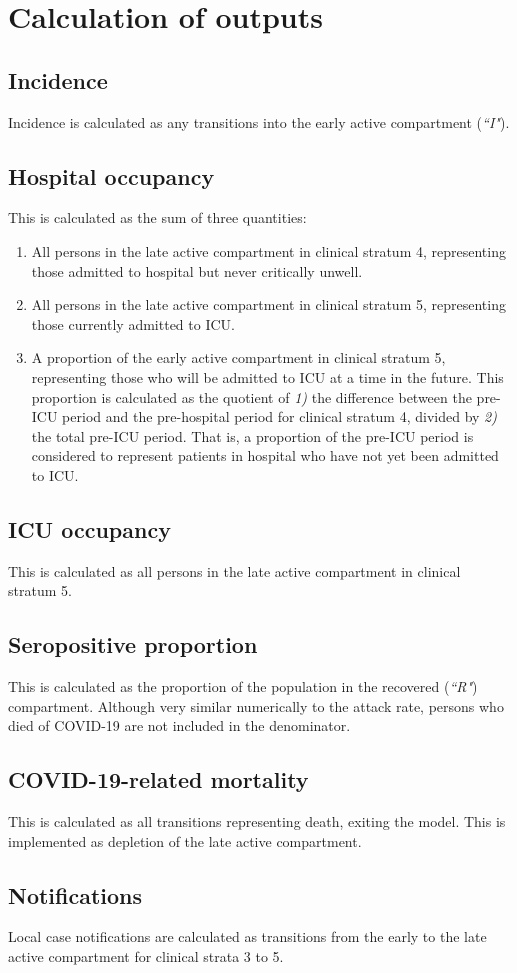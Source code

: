 \section{Calculation of outputs}

\subsection{Incidence}
Incidence is calculated as any transitions into the early active compartment (\textit{``I"}).

\subsection{Hospital occupancy}
This is calculated as the sum of three quantities:
\begin{enumerate}
    \item All persons in the late active compartment in clinical stratum 4, representing those admitted to hospital but never critically unwell.
    \item All persons in the late active compartment in clinical stratum 5, representing those currently admitted to ICU.
    \item A proportion of the early active compartment in clinical stratum 5, representing those who will be admitted to ICU at a time in the future. This proportion is calculated as the quotient of \textit{1)} the difference between the pre-ICU period and the pre-hospital period for clinical stratum 4, divided by \textit{2)} the total pre-ICU period. That is, a proportion of the pre-ICU period is considered to represent patients in hospital who have not yet been admitted to ICU.
\end{enumerate}

\subsection{ICU occupancy}
This is calculated as all persons in the late active compartment in clinical stratum 5.

\subsection{Seropositive proportion}
This is calculated as the proportion of the population in the recovered (\textit{``R"}) compartment. Although very similar numerically to the attack rate, persons who died of COVID-19 are not included in the denominator.

\subsection{COVID-19-related mortality}
This is calculated as all transitions representing death, exiting the model. This is implemented as depletion of the late active compartment.

\subsection{Notifications}
Local case notifications are calculated as transitions from the early to the late active compartment for clinical strata 3 to 5.

